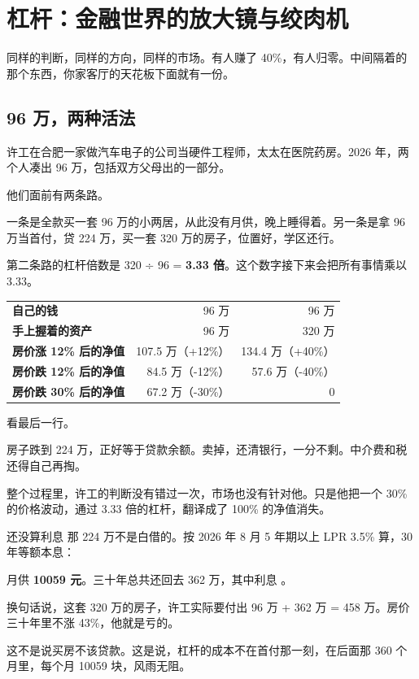 \chapter{杠杆：金融世界的放大镜与绞肉机}

\begin{ledetext}
同样的判断，同样的方向，同样的市场。有人赚了 40\%，有人归零。中间隔着的那个东西，你家客厅的天花板下面就有一份。
\end{ledetext}

\section{96 万，两种活法}

许工在合肥一家做汽车电子的公司当硬件工程师，太太在医院药房。2026 年，两个人凑出 96 万，包括双方父母出的一部分。

他们面前有两条路。

一条是全款买一套 96 万的小两居，从此没有月供，晚上睡得着。另一条是拿 96 万当首付，贷 224 万，买一套 320 万的房子，位置好，学区还行。

第二条路的杠杆倍数是 320 ÷ 96 = \textbf{3.33 倍}。这个数字接下来会把所有事情乘以 3.33。

\begin{tablewrap}
\begin{xltabular}{\linewidth}{Xrr}
\toprule
\bthead{~} &  &  \\
\midrule
\textbf{自己的钱} & 96 万 & 96 万 \\
\textbf{手上握着的资产} & 96 万 & 320 万 \\
\textbf{房价涨 12\% 后的净值} & 107.5 万（+12\%） & 134.4 万（+40\%） \\
\textbf{房价跌 12\% 后的净值} & 84.5 万（-12\%） & 57.6 万（-40\%） \\
\textbf{房价跌 30\% 后的净值} & 67.2 万（-30\%） & 0 \\
\bottomrule
\end{xltabular}
\end{tablewrap}

看最后一行。

房子跌到 224 万，正好等于贷款余额。卖掉，还清银行，一分不剩。中介费和税还得自己再掏。

整个过程里，许工的判断没有错过一次，市场也没有针对他。只是他把一个 30\% 的价格波动，通过 3.33 倍的杠杆，翻译成了 100\% 的净值消失。

\begin{egbox}{还没算利息}
那 224 万不是白借的。按 2026 年 8 月 5 年期以上 LPR 3.5\% 算，30 年等额本息：

月供 \textbf{10059 元}。三十年总共还回去 362 万，其中利息 。

换句话说，这套 320 万的房子，许工实际要付出 96 万 + 362 万 = 458 万。房价三十年里不涨 43\%，他就是亏的。

这不是说买房不该贷款。这是说，杠杆的成本不在首付那一刻，在后面那 360 个月里，每个月 10059 块，风雨无阻。

\end{egbox}

